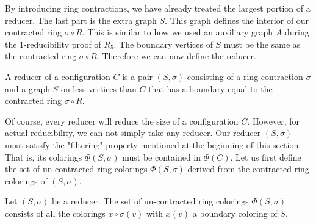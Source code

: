 By introducing ring contractions, we have already treated the largest portion of a reducer. The last part is the extra graph $S$. This graph defines the interior of our contracted ring $\sigma \circ R$. This is similar to how we used an auxiliary graph $A$ during the 1-reducibility proof of $R_5$. The boundary vertices of $S$ must be the same as the contracted ring $\sigma \circ R$. Therefore we can now define the reducer.

\begin{definition}
    A reducer of a configuration $C$ is a pair $(S, \sigma)$  consisting of a ring contraction $\sigma$ and a graph $S$ on less vertices than $C$ that has a boundary equal to the contracted ring $\sigma \circ R$.
\end{definition}

Of course, every reducer will reduce the size of a configuration $C$. However, for actual reducibility, we can not simply take any reducer. Our reducer $(S, \sigma)$ must satisfy the "filtering" property mentioned at the beginning of this section. That is, its colorings $\Phi(S, \sigma)$ must be contained in $\overline{\Phi}(C)$. Let us first define the set of un-contracted ring colorings $\Phi(S, \sigma)$ derived from the contracted ring colorings of $(S, \sigma)$.

\begin{definition}
    Let $(S, \sigma)$ be a reducer. The set of un-contracted ring colorings $\Phi(S, \sigma)$ consists of all the colorings $x \circ \sigma(v)$ with $x(v)$ a boundary coloring of $S$.
\end{definition}





